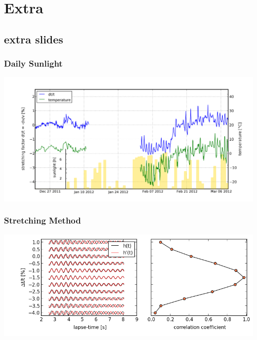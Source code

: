 \documentclass[compress=false,usepdftitle=false, subsection=false,xcolor=dvipsnames]{beamer}
\begin{document}
%
\section{Extra}
\subsection{extra slides}
\begin{frame}
	\frametitle{Daily Sunlight}
	\begin{center}
		\includegraphics[width=\linewidth]{Figures/whole3.png}
    \end{center}
\end{frame}

\begin{frame}
	\frametitle{Stretching Method}
	\begin{center}
		\includegraphics[width=\linewidth]{Figures/stretchingMethod.png}
    \end{center}
\end{frame}
\end{document}
